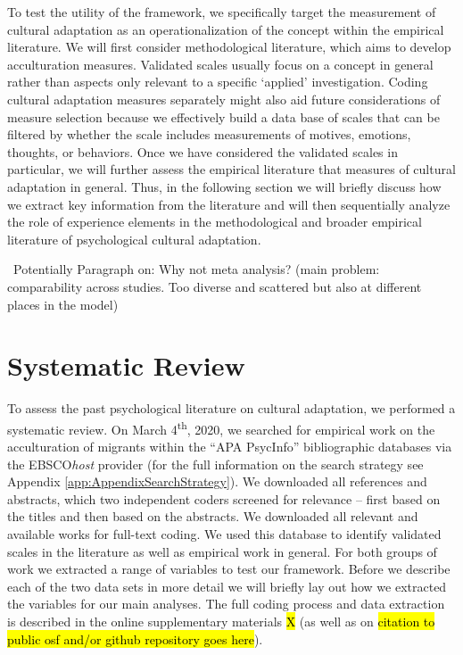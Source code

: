 \documentclass[man, 12pt, a4paper]{apa7}
\newcommand\Question[1][2ex]{%
  \renewcommand\stacktype{L}%
  \scaleto{\stackon[1.3pt]{\color{red}$\triangle$}{\tiny\bfseries ?}}{#1}}%
\begin{document}
To test the utility of the framework, we specifically target the measurement of cultural adaptation as an operationalization of the concept within the empirical literature. We will first consider methodological literature, which aims to develop acculturation measures. Validated scales usually focus on a concept in general rather than aspects only relevant to a specific `applied' investigation. Coding cultural adaptation measures separately might also aid future considerations of measure selection because we effectively build a data base of scales that can be filtered by whether the scale includes measurements of motives, emotions, thoughts, or behaviors. Once we have considered the validated scales in particular, we will further assess the empirical literature that measures of cultural adaptation in general. Thus, in the following section we will briefly discuss how we extract key information from the literature and will then sequentially analyze the role of experience elements in the methodological and broader empirical literature of psychological cultural adaptation.

\Question\ Potentially Paragraph on: Why not meta analysis? (main problem: comparability across studies. Too diverse and scattered but also at different places in the model)

\section{Systematic Review}
To assess the past psychological literature on cultural adaptation, we performed a systematic review. On March 4\textsuperscript{th}, 2020, we searched for empirical work on the acculturation of migrants within the ``APA PsycInfo'' bibliographic databases via the EBSCO\textit{host} provider (for the full information on the search strategy see Appendix \ref{app:AppendixSearchStrategy}). We downloaded all references and abstracts, which two independent coders screened for relevance -- first based on the titles and then based on the abstracts. We downloaded all relevant and available works for full-text coding. We used this database to identify validated scales in the literature as well as empirical work in general. For both groups of work we extracted a range of variables to test our framework. Before we describe each of the two data sets in more detail we will briefly lay out how we extracted the variables for our main analyses. The full coding process and data extraction is described in the online supplementary materials \hl{X} (as well as on \hl{citation to public osf and/or github repository goes here}).
\end{document}
